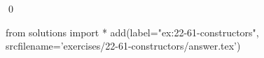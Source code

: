 
\begin{ex}
  \label{ex:22-61-constructors}
  
  \qed
\end{ex}
\begin{python0}
from solutions import *
add(label="ex:22-61-constructors",
    srcfilename='exercises/22-61-constructors/answer.tex')
\end{python0}
